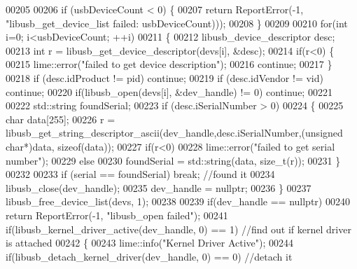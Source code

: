 \begin{DoxyCode}
00205 
00206     \textcolor{keywordflow}{if} (usbDeviceCount < 0) \{
00207         \textcolor{keywordflow}{return} ReportError(-1, \textcolor{stringliteral}{"libusb\_get\_device\_list failed: %
      usbDeviceCount)));
00208     \}
00209 
00210     \textcolor{keywordflow}{for}(\textcolor{keywordtype}{int} i=0; i<usbDeviceCount; ++i)
00211     \{
00212         libusb\_device\_descriptor desc;
00213         \textcolor{keywordtype}{int} r = libusb\_get\_device\_descriptor(devs[i], &desc);
00214         \textcolor{keywordflow}{if}(r<0) \{
00215             lime::error(\textcolor{stringliteral}{"failed to get device description"});
00216             \textcolor{keywordflow}{continue};
00217         \}
00218         \textcolor{keywordflow}{if} (desc.idProduct != pid) \textcolor{keywordflow}{continue};
00219         \textcolor{keywordflow}{if} (desc.idVendor != vid) \textcolor{keywordflow}{continue};
00220         \textcolor{keywordflow}{if}(libusb\_open(devs[i], &dev\_handle) != 0) \textcolor{keywordflow}{continue};
00221 
00222         std::string foundSerial;
00223         \textcolor{keywordflow}{if} (desc.iSerialNumber > 0)
00224         \{
00225             \textcolor{keywordtype}{char} data[255];
00226             r = libusb\_get\_string\_descriptor\_ascii(dev\_handle,desc.iSerialNumber,(\textcolor{keywordtype}{unsigned} \textcolor{keywordtype}{char}*)data, \textcolor{keyword}{
      sizeof}(data));
00227             \textcolor{keywordflow}{if}(r<0)
00228                 lime::error(\textcolor{stringliteral}{"failed to get serial number"});
00229             \textcolor{keywordflow}{else}
00230                 foundSerial = std::string(data, \textcolor{keywordtype}{size\_t}(r));
00231         \}
00232 
00233         \textcolor{keywordflow}{if} (serial == foundSerial) \textcolor{keywordflow}{break}; \textcolor{comment}{//found it}
00234         libusb\_close(dev\_handle);
00235         dev\_handle = \textcolor{keyword}{nullptr};
00236     \}
00237     libusb\_free\_device\_list(devs, 1);
00238 
00239     \textcolor{keywordflow}{if}(dev\_handle == \textcolor{keyword}{nullptr})
00240         \textcolor{keywordflow}{return} ReportError(-1, \textcolor{stringliteral}{"libusb\_open failed"});
00241     \textcolor{keywordflow}{if}(libusb\_kernel\_driver\_active(dev\_handle, 0) == 1)   \textcolor{comment}{//find out if kernel driver is attached}
00242     \{
00243         lime::info(\textcolor{stringliteral}{"Kernel Driver Active"});
00244         \textcolor{keywordflow}{if}(libusb\_detach\_kernel\_driver(dev\_handle, 0) == 0) \textcolor{comment}{//detach it}
}
\end{DoxyCode}
